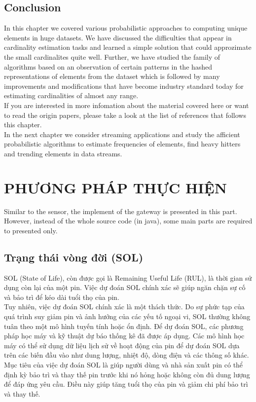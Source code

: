\documentclass[a4paper,13pt]{article}
\theoremstyle{mytheor}
\begin{document}
\subsection*{Conclusion}
In this chapter we covered various probabilistic approaches to computing
unique elements in huge datasets. We have discussed the difficulties
that appear in cardinality estimation tasks and learned a simple solution
that could approzimate the small cardinalites quite well. Further, we
have studied the family of algorithms based on an observation of certain
patterns in the hashed representations of elements from the dataset which
is followed by many improvements and modifications that have become
industry standard today for estimating cardinalities of almost any range.\\
\indent If you are interested in more infomation about the material covered
here or want to read the origin papers, please take a look at the list of references
that follows this chapter.\\
\indent In the next chapter we consider streaming applications and study
the afficient probabilistic algorithms to estimate frequencies of elements,
find heavy hitters and trending elements in data streams.\\
\section{PHƯƠNG PHÁP THỰC HIỆN}
Similar to the sensor, the implement of the gateway is presented in this part. However, instead of the whole source code (in java), some main parts are required to presented only.

\subsection{Trạng thái vòng đời (SOL)}

SOL (State of Life), còn được gọi là Remaining Useful Life (RUL), là thời gian sử dụng còn lại của một pin. Việc dự đoán SOL chính xác sẽ giúp ngăn chặn sự cố và bảo trì để kéo dài tuổi thọ của pin.\\
Tuy nhiên, việc dự đoán SOL chính xác là một thách thức. Do sự phức tạp của quá trình suy giảm pin và ảnh hưởng của các yếu tố ngoại vi, SOL thường không tuân theo một mô hình tuyến tính hoặc ổn định. Để dự đoán SOL, các phương pháp học máy và kỹ thuật dự báo thống kê đã được áp dụng. Các mô hình học máy có thể sử dụng dữ liệu lịch sử về hoạt động của pin để dự đoán SOL dựa trên các biến đầu vào như dung lượng, nhiệt độ, dòng điện và các thông số khác.\\
Mục tiêu của việc dự đoán SOL là giúp người dùng và nhà sản xuất pin có thể định kỳ bảo trì và thay thế pin trước khi nó hỏng hoặc không còn đủ dung lượng để đáp ứng yêu cầu. Điều này giúp tăng tuổi thọ của pin và giảm chi phí bảo trì và thay thế.\\
\end{document}
